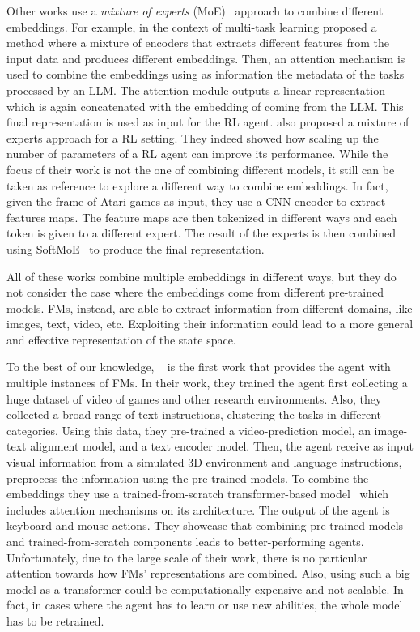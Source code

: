 Other works use a \textit{mixture of experts} (MoE)~\citep{shazeer2017outrageously} approach to combine different embeddings.
For example, in the context of multi-task learning \citet{sodhani2021multi} proposed a method where a mixture of encoders that extracts different features from the input data and produces different embeddings.
Then, an attention mechanism is used to combine the embeddings using as information the metadata of the tasks processed by an LLM\@.
The attention module outputs a linear representation which is again concatenated with the embedding of coming from the LLM\@.
This final representation is used as input for the RL agent.
\citet{obando2024mixtures} also proposed a mixture of experts approach for a RL setting.
They indeed showed how scaling up the number of parameters of a RL agent can improve its performance.
While the focus of their work is not the one of combining different models, it still can be taken as reference to explore a different way to combine embeddings.
In fact, given the frame of Atari games as input, they use a CNN encoder to extract features maps.
The feature maps are then tokenized in different ways and each token is given to a different expert.
The result of the experts is then combined using SoftMoE~\citep{puigcerver2023sparse} to produce the final representation.

All of these works combine multiple embeddings in different ways, but they do not consider the case where the embeddings come from different pre-trained models.
FMs, instead, are able to extract information from different domains, like images, text, video, etc.
Exploiting their information could lead to a more general and effective representation of the state space.

To the best of our knowledge, ~\citet{sima2024} is the first work that provides the agent with multiple instances of FMs.
In their work, they trained the agent first collecting a huge dataset of video of games and other research environments.
Also, they collected a broad range of text instructions, clustering the tasks in different categories.
Using this data, they pre-trained a video-prediction model, an image-text alignment model, and a text encoder model.
Then, the agent receive as input visual information from a simulated 3D environment and language instructions,
preprocess the information using the pre-trained models.
To combine the embeddings they use a  trained-from-scratch transformer-based model~\citep{dai2019transformer} which includes attention mechanisms on its architecture.
The output of the agent is keyboard and mouse actions.
They showcase that combining pre-trained models and trained-from-scratch components leads to better-performing agents.
Unfortunately, due to the large scale of their work, there is no particular attention towards how FMs' representations are combined.
Also, using such a big model as a transformer could be computationally expensive and not scalable.
In fact, in cases where the agent has to learn or use new abilities, the whole model has to be retrained.

